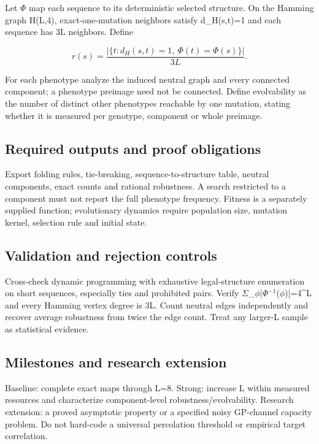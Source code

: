 \documentclass[
  11pt,
]{article}
\begin{document}
Let \ensuremath{\Phi} map each sequence to its deterministic selected
structure. On the Hamming graph H(L,4), exact-one-mutation neighbors
satisfy d\_H(s,t)=1 and each sequence has 3L neighbors. Define

\[r(s)=\frac{|\{t:d_H(s,t)=1,\ \Phi (t)=\Phi (s)\}|}{3L}.\]

For each phenotype analyze the induced neutral graph and every connected
component; a phenotype preimage need not be connected. Define
evolvability as the number of distinct other phenotypes reachable by one
mutation, stating whether it is measured per genotype, component or
whole preimage.

\subsection{Required outputs and proof obligations}

Export folding rules, tie-breaking, sequence-to-structure table, neutral
components, exact counts and rational robustness. A search restricted to
a component must not report the full phenotype frequency. Fitness is a
separately supplied function; evolutionary dynamics require population
size, mutation kernel, selection rule and initial state.

\subsection{Validation and rejection controls}

Cross-check dynamic programming with exhaustive legal-structure
enumeration on short sequences, especially ties and prohibited pairs.
Verify
\ensuremath{\Sigma}\_\ensuremath{\phi}|\ensuremath{\Phi}\ensuremath{{}^{-1}}(\ensuremath{\phi})|=4\textasciicircum{}L
and every Hamming vertex degree is 3L. Count neutral edges independently
and recover average robustness from twice the edge count. Treat any
larger-L sample as statistical evidence.

\subsection{Milestones and research extension}

Baseline: complete exact maps through L=8. Strong: increase L within
measured resources and characterize component-level
robustness/evolvability. Research extension: a proved asymptotic
property or a specified noisy GP-channel capacity problem. Do not
hard-code a universal percolation threshold or empirical target
correlation.
\end{document}
